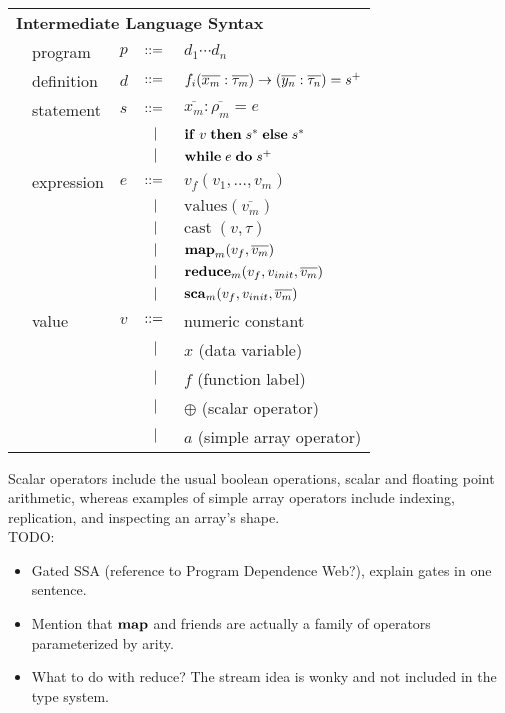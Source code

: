 \documentclass[preprint]{sigplanconf}
\begin{document}
\begin{tabular}{m{0.1cm}m{1.5cm}m{0.1cm}m{0.2cm}p{4.8cm}}
 \multicolumn{5}{l}{\textbf{Intermediate Language Syntax}}  \\[4pt]
& program & $p$ &  $::=$   &  $d_1 \cdots d_n $ \\[4pt]
& definition & $d$ & $::=$ & $f_i(\overline{x_m} : \overline{\tau_m}) \rightarrow (\overline{y_n} : \overline{\tau_n}) =s^{\small{+}}$ \\[4pt]
& statement  & $s$ & $::=$ & $\overline{x_m} : \overline{\rho_m} = e $\\[2pt]
&            &     & $\ \ | \ \ $    & $\mbox{\textbf{if}} \;v\; \mbox{\textbf{then}} \;s^*\; \mbox{\textbf{else}} \;s^*$ \\[2pt]
&            &     & $\ \ | \ \ $    & $\mbox{\textbf{while}} \;e\; \mbox{\textbf{do}} \;s^+\;  $ \\[4pt]
& expression & $e$ & $::=$ & $ v_{f}(v_1, \ldots, v_m)$ \\[2pt]
&            &     & $\ \ | \ \ $    & $\textrm{values} (\overline{v_m})$ \\[2pt]
&            &     & $\ \ | \ \ $    & $\textrm{cast} \; (v, \tau)$ \\[2pt] 
&            &     & $\ \ | \ \ $    & $\mbox{\textbf{map}}_m (v_{f},\overline{v_m})$ \\[2pt]
&            &     & $\ \ | \ \ $    & $\mbox{\textbf{reduce}}_m (v_{f}, v_{init}, \overline{v_m})$ \\[2pt]
&            &     & $\ \ | \ \ $    & $\mbox{\textbf{sca}}_m (v_{f}, v_{init}, \overline{v_m})$ \\[4pt]
& value      & $v$ & $::=$ & numeric constant\\[2pt]
&            &     & $\ \ | \ \ $    &  $x$  \quad \small{(data variable)} \\[2pt]
&            &     & $\ \ | \ \ $    &  $f$  \quad \small{(function label)} \\[2pt]
&            &     & $\ \ | \ \ $    &  $\oplus$ \quad \small{(scalar operator)} \\[2pt]
&            &     & $\ \ | \ \ $    &  $a$ \quad \small{(simple array operator)} \\[4pt]
\end{tabular}
Scalar operators include the usual boolean operations, scalar and floating point arithmetic, whereas examples of simple array operators include indexing, replication, and inspecting an array's shape. 
\\TODO: 
\begin{itemize}
\item Gated SSA (reference to Program Dependence Web?), explain gates in one sentence. 
\item Mention that $\mbox{\textbf{map}}$ and friends are actually a family of operators parameterized by arity. 
\item What to do with reduce? The stream idea is wonky and not included in the type system. 
\end{itemize} 
\end{document}
